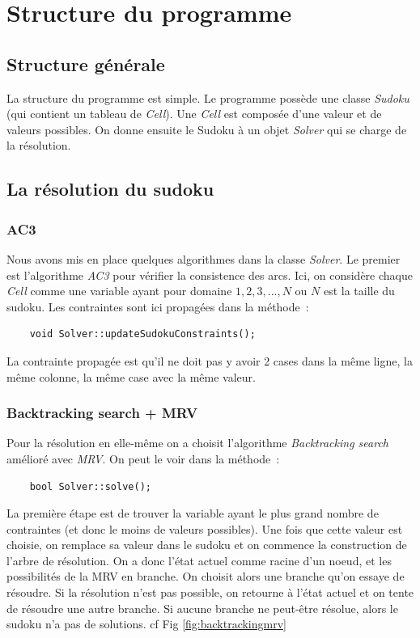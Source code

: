 \documentclass{article}
\begin{document}
{\section{Structure du programme}
\subsection{Structure générale}

La structure du programme est simple. Le programme possède une classe \emph{Sudoku} (qui contient un tableau de \emph{Cell}). Une \emph{Cell} est composée d'une valeur et de valeurs possibles. On donne ensuite le Sudoku à un objet \emph{Solver} qui se charge de la résolution.

\subsection{La résolution du sudoku}

\subsubsection{AC3}

Nous avons mis en place quelques algorithmes dans la classe \emph{Solver}. Le premier est l'algorithme \emph{AC3} pour vérifier la consistence des arcs. Ici, on considère chaque \emph{Cell} comme une variable ayant pour domaine ${1,2,3,...,N}$ ou $N$ est la taille du sudoku. Les contraintes sont ici propagées dans la méthode~:

\begin{verbatim}
	void Solver::updateSudokuConstraints();
\end{verbatim}

La contrainte propagée est qu'il ne doit pas y avoir 2 cases dans la même ligne, la même colonne, la même case avec la même valeur.

\subsubsection{Backtracking search + MRV}

Pour la résolution en elle-même on a choisit l'algorithme \emph{Backtracking search} amélioré avec \emph{MRV}. On peut le voir dans la méthode~:
\begin{verbatim}
	bool Solver::solve();
\end{verbatim}

La première étape est de trouver la variable ayant le plus grand nombre de contraintes (et donc le moins de valeurs possibles). Une fois que cette valeur est choisie, on remplace sa valeur dans le sudoku et on commence la construction de l'arbre de résolution. On a donc l'état actuel comme racine d'un noeud, et les possibilités de la MRV en branche. On choisit alors une branche qu'on essaye de résoudre. Si la résolution n'est pas possible, on retourne à l'état actuel et on tente de résoudre une autre branche. Si aucune branche ne peut-être résolue, alors le sudoku n'a pas de solutions. cf Fig \ref{fig:backtrackingmrv}

}
\end{document}
